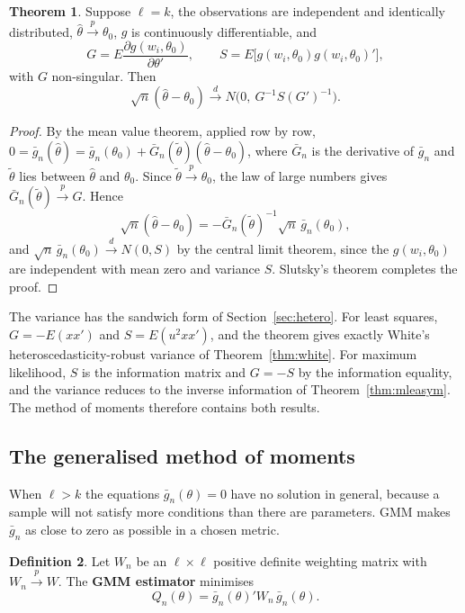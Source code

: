 \documentclass[11pt,a4paper]{article}
\numberwithin{equation}{section}
\theoremstyle{definition}
\newtheorem{thm}{Theorem}[subsection]
\newtheorem{defn}[thm]{Definition}
\begin{document}
\begin{thm}
\label{thm:mm}
Suppose $\ell = k$, the observations are independent and identically distributed, $\hat\theta \xrightarrow{p} \theta_0$, $g$ is continuously differentiable, and
\[
G = E\frac{\partial g(w_i, \theta_0)}{\partial\theta'}, \qquad S = E\bigl[g(w_i, \theta_0)g(w_i, \theta_0)'\bigr],
\]
with $G$ non-singular. Then
\[
\sqrt n(\hat\theta - \theta_0) \xrightarrow{d} N\bigl(0,\ G^{-1}S(G')^{-1}\bigr) .
\]
\end{thm}

\begin{proof}
By the mean value theorem, applied row by row, $0 = \bar g_n(\hat\theta) = \bar g_n(\theta_0) + \bar G_n(\tilde\theta)(\hat\theta - \theta_0)$, where $\bar G_n$ is the derivative of $\bar g_n$ and $\tilde\theta$ lies between
$\hat\theta$ and $\theta_0$. Since $\tilde\theta \xrightarrow{p} \theta_0$, the law of large numbers gives $\bar G_n(\tilde\theta) \xrightarrow{p} G$. Hence
\[
\sqrt n(\hat\theta - \theta_0) = -\bar G_n(\tilde\theta)^{-1}\sqrt n\,\bar g_n(\theta_0),
\]
and $\sqrt n\,\bar g_n(\theta_0) \xrightarrow{d} N(0, S)$ by the central limit theorem, since the $g(w_i, \theta_0)$ are independent with mean zero and variance $S$. Slutsky's theorem
completes the proof.
\end{proof}

The variance has the sandwich form of Section~\ref{sec:hetero}. For least squares, $G = -E(xx')$ and $S = E(u^2xx')$, and the theorem gives exactly White's
heteroscedasticity-robust variance of Theorem~\ref{thm:white}. For maximum likelihood, $S$ is the information matrix and $G = -S$ by the information
equality, and the variance reduces to the inverse information of Theorem~\ref{thm:mleasym}. The method of moments therefore contains both results.

\subsection{The generalised method of moments}
\label{ssec:gmmdef}

When $\ell > k$ the equations $\bar g_n(\theta) = 0$ have no solution in general, because a sample will not satisfy more conditions than there are
parameters. GMM makes $\bar g_n$ as close to zero as possible in a chosen metric.

\begin{defn}
Let $W_n$ be an $\ell \times \ell$ positive definite weighting matrix with $W_n \xrightarrow{p} W$. The \textbf{GMM estimator} minimises
\[
Q_n(\theta) = \bar g_n(\theta)'W_n\,\bar g_n(\theta) .
\]
\end{defn}
\end{document}
